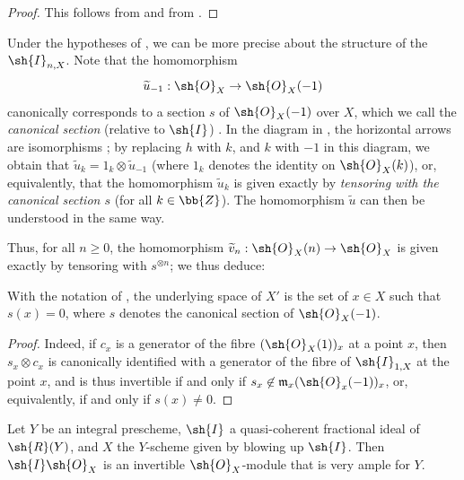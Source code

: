 \begin{proof}
This follows from  and from .
\end{proof}

\begin{env}[8.1.9]
\label{II.8.1.9}
Under the hypotheses of , we can be more precise about the structure of the $\sh{I}_{n,X}$.
Note that the homomorphism
\[
  \widetilde{u}_{-1}: \sh{O}_X \to \sh{O}_X(-1)
\]
canonically corresponds to a section $s$ of $\sh{O}_X(-1)$ over $X$, which we call the \emph{canonical section} (relative to $\sh{I}$) .
In the diagram in , the horizontal arrows are isomorphisms ; by replacing $h$ with $k$, and $k$ with $-1$ in this diagram, we obtain that $\widetilde{u}_k = 1_k \otimes \widetilde{u}_{-1}$ (where $1_k$ denotes the identity on $\sh{O}_X(k)$), or, equivalently, that the homomorphism $\widetilde{u}_k$ is given exactly by \emph{tensoring with the canonical section $s$} (for all $k\in\bb{Z}$).
The homomorphism $\widetilde{u}$  can then be understood in the same way.

Thus, for all $n\geq0$, the homomorphism $\widetilde{v}_n: \sh{O}_X(n)\to\sh{O}_X$ is given exactly by tensoring with $s^{\otimes n}$;
we thus deduce:
\end{env}

\begin{corollary}[8.1.10]
\label{II.8.1.10}
With the notation of , the underlying space of $X'$ is the set of $x\in X$ such that $s(x)=0$, where $s$ denotes the canonical section of $\sh{O}_X(-1)$.
\end{corollary}

\begin{proof}
Indeed, if $c_x$ is a generator of the fibre $(\sh{O}_X(1))_x$ at a point $x$, then $s_x\otimes c_x$ is canonically identified with a generator of the fibre of $\sh{I}_{1,X}$ at the point $x$, and is thus invertible if and only if $s_x\not\in\mathfrak{m}_x(\sh{O}_x(-1))_x$, or, equivalently, if and only if $s(x)\neq0$.
\end{proof}

\begin{proposition}[8.1.11]
\label{II.8.1.11}
Let $Y$ be an integral prescheme, $\sh{I}$ a quasi-coherent fractional ideal of $\sh{R}(Y)$, and $X$ the $Y$-scheme given by blowing up $\sh{I}$.
Then $\sh{I}\sh{O}_X$ is an invertible $\sh{O}_X$-module that is very ample for $Y$.
\end{proposition}


